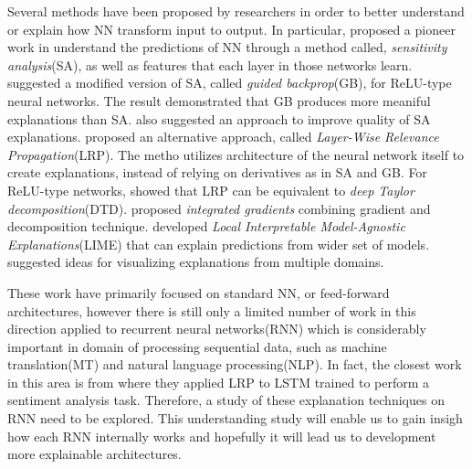 Several methods have been proposed by researchers in order to better understand or explain how NN transform input to output. In particular, \cite{SimonyanDeepConvolutionalNetworks2013}  proposed a pioneer work in understand the predictions of NN through a method called, \textit{sensitivity analysis}(SA), as well as features that each layer in those networks learn. \cite{SpringenbergStrivingSimplicityAll2014e} suggested a modified version of SA, called \textit{guided backprop}(GB), for ReLU-type neural networks. The result demonstrated that GB produces more meaniful explanations than SA. \cite{SmilkovSmoothGradremovingnoise2017} also suggested an approach to improve quality of SA explanations. \cite{BachPixelWiseExplanationsNonLinear2015} proposed an alternative approach, called \textit{Layer-Wise Relevance Propagation}(LRP). The metho utilizes architecture of the neural network itself to create explanations, instead of relying on derivatives as in SA and GB. For ReLU-type networks,\cite{MontavonExplainingnonlinearclassification2017} showed that LRP can be equivalent to \textit{deep Taylor decomposition}(DTD). \cite{SundararajanAxiomaticAttributionDeep2017} proposed \textit{integrated gradients} combining gradient and decomposition technique. \cite{RibeiroWhyShouldTrust2016} developed \textit{Local Interpretable Model-Agnostic Explanations}(LIME) that can explain predictions from wider set of models. \cite{OlahBuildingBlocksInterpretability2018} suggested ideas for visualizing explanations from multiple domains. 

These work have primarily focused on standard NN, or feed-forward architectures, however there is still only a limited number of work in this direction applied to recurrent neural networks(RNN) which is considerably important in domain of processing sequential data, such as machine translation(MT) and natural language processing(NLP). In fact, the closest work in this area is from \cite{ArrasExplainingRecurrentNeural2017} where they applied LRP to  LSTM\cite{HochreiterLongshorttermmemory1997} trained to perform a sentiment analysis task. Therefore, a study of these explanation techniques on RNN need to be explored. This understanding study will enable us to gain insigh how each RNN internally works and hopefully it will lead us to development more explainable architectures.




